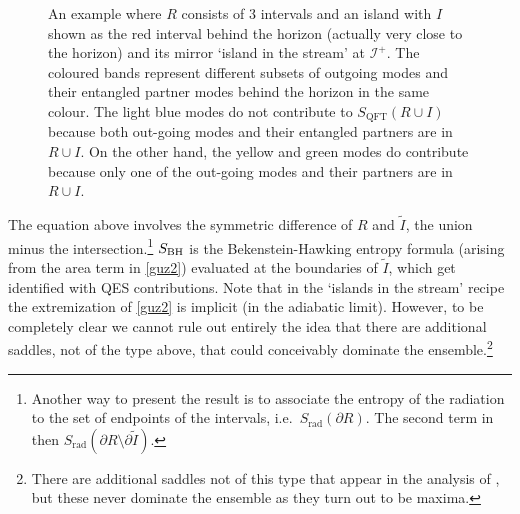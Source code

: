 \documentclass[12pt]{article}
\begin{document}
\begin{figure}[ht]
\begin{center}
\begin{tikzpicture} [scale=1.4]
\end{tikzpicture}
\caption{\footnotesize An example where $R$ consists of 3 intervals and an island with $I$ shown as the red interval behind the horizon (actually very close to the horizon) and its mirror `island in the stream' at $\mathscr I^+$.  The coloured bands represent different subsets of outgoing modes and their entangled partner modes behind the horizon in the same colour. The light blue modes do not contribute to $S_\text{QFT}(R\cup I)$ because both out-going modes and their entangled partners are in $R\cup I$. On the other hand, the yellow and green modes do contribute because only one of the out-going modes and their partners are in $R\cup I$.}
\label{fig1} 
\end{center}
\end{figure}
The equation above involves the symmetric difference of $R$ and $\tilde I$, the union minus the intersection.\footnote{Another way to present the result is to associate the entropy of the radiation to the set of endpoints of the intervals, i.e.~$S_\text{rad}(\partial R)$. The second term in  then $S_\text{rad}(\partial R\setminus\partial\tilde I)$.} $S_{\rm BH}$ is the Bekenstein-Hawking entropy formula (arising from the area term in \eqref{guz2}) evaluated at the boundaries of $\tilde I$, which get identified with QES contributions.  Note that in the `islands in the stream' recipe the extremization of \eqref{guz2}  is implicit (in the adiabatic limit). However, to be completely clear we cannot rule out entirely the idea that there are  additional saddles, not of the type  above, that could conceivably dominate the ensemble.\footnote{There are additional saddles not of this type that appear in the analysis of \cite{Brown:2019rox}, but these never dominate the ensemble as they turn out to be  maxima.}
\end{document}
